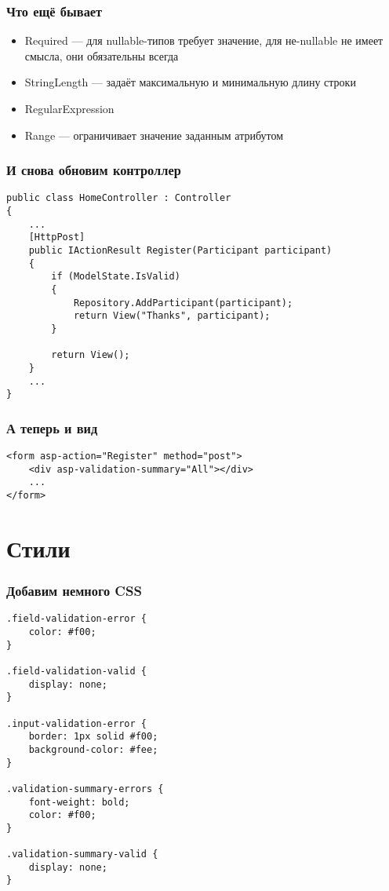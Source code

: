 \documentclass[xetex,mathserif,serif]{beamer}
\begin{document}
    \begin{frame}
        \frametitle{Что ещё бывает}
        \begin{itemize}
            \item Required --- для nullable-типов требует значение, для не-nullable не имеет смысла, они обязательны всегда
            \item StringLength --- задаёт максимальную и минимальную длину строки
            \item RegularExpression
            \item Range --- ограничивает значение заданным атрибутом
        \end{itemize}
    \end{frame}

    \begin{frame}[fragile]
        \frametitle{И снова обновим контроллер}
        \begin{verbatim}
public class HomeController : Controller
{
    ...
    [HttpPost]
    public IActionResult Register(Participant participant)
    {
        if (ModelState.IsValid)
        {
            Repository.AddParticipant(participant);
            return View("Thanks", participant);
        }
    
        return View();
    }
    ...
}
        \end{verbatim}
    \end{frame}

    \begin{frame}[fragile]
        \frametitle{А теперь и вид}
        \begin{verbatim}
<form asp-action="Register" method="post">
    <div asp-validation-summary="All"></div>
    ...
</form>
        \end{verbatim}
    \end{frame}

    \section{Стили}

    \begin{frame}[fragile]
        \frametitle{Добавим немного CSS}
        \begin{scriptsize}
            \begin{verbatim}
.field-validation-error {
    color: #f00;
}

.field-validation-valid {
    display: none;
}

.input-validation-error {
    border: 1px solid #f00;
    background-color: #fee;
}

.validation-summary-errors {
    font-weight: bold;
    color: #f00;
}

.validation-summary-valid {
    display: none;
}
            \end{verbatim}
        \end{scriptsize}
    \end{frame}
\end{document}

